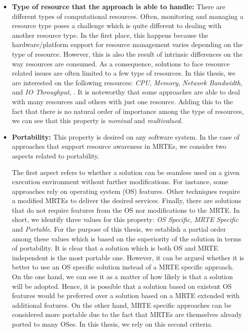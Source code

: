 \begin{itemize}
\item\textbf{Type of resource that the approach is able to handle:}
There are different types of computational resources.
Often, monitoring and managing a resource type poses a challenge which is quite different to dealing with another resource type.
In the first place, this happens because the hardware/platform support for resource management varies depending on the type of resource.
However, this is also the result of intrinsic differences on the way resources are consumed.
As a consequence, solutions to face resource related issues are often limited to a few type of resources.
In this thesis, we are interested on the following resources: \textit{CPU}, \textit{Memory}, \textit{Network Bandwidth}, and \textit{IO Throughput}, .
It is noteworthy that some approaches are able to deal with many resources and others with just one resource.
Adding this to the fact that there is no natural order of importance among the type of resources, we can see that this property is \textit{nominal} and \textit{multivalued}.  

\item \textbf{Portability:}
This property is desired on any software system.
In the case of approaches that support resource awareness in MRTEs, we consider two aspects related to portability.

The first aspect refers to whether a solution can be seamless used on a given execution environment without further modifications.
For instance, some approaches rely on operating system (OS) features.
Other techniques require a modified MRTEs to deliver the desired services.
Finally, there are solutions that do not require features from the OS nor modifications to the MRTE.
In short, we identify three values for this property: \textit{OS Specific}, \textit{MRTE Specific} and \textit{Portable}.
For the purpose of this thesis, we establish a partial order among these values which is based on the superiority of the solution in terms of portability.
It is clear that a solution which is both OS and MRTE independent is the most portable one.
However, it can be argued whether it is better to use an OS specific solution instead of a MRTE specific approach.        
On the one hand, we can see it as a matter of how likely is that a solution will be adopted. 
Hence, it is possible that a solution based on existent OS features would be preferred over a solution based on a MRTE extended with additional features.
On the other hand, MRTE specific approaches can be considered more portable due to the fact that MRTEs are themselves already ported to many OSes.
In this thesis, we rely on this second criteria.


\end{itemize}
